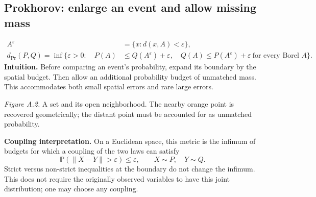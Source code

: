 \documentclass[12pt]{article}
\newcommand{\Prob}{\mathbb P}
\begin{document}
\clearpage
\subsection{Prokhorov: enlarge an event and allow missing mass}\label{sec:prok}
\begin{align}
 A^\varepsilon&=\{x:d(x,A)<\varepsilon\},\\
 d_{\mathrm{Pr}}(P,Q)=\inf\{\varepsilon>0:\quad
 P(A)&\le Q(A^\varepsilon)+\varepsilon,\quad
 Q(A)\le P(A^\varepsilon)+\varepsilon
 \ \text{for every Borel }A\}.
\end{align}
\textbf{Intuition.} Before comparing an event's probability, expand its
boundary by the spatial budget. Then allow an additional probability
budget of unmatched mass. This accommodates both small spatial errors and
rare large errors.

\begin{center}
\end{center}
\textit{Figure A.2.} A set and its open neighborhood. The nearby orange point
is recovered geometrically; the distant point must be accounted for as
unmatched probability.

\textbf{Coupling interpretation.} On a Euclidean space, this metric is the
infimum of budgets for which a coupling of the two laws can satisfy
\begin{equation}
 \Prob(\|X-Y\|>\varepsilon)\le\varepsilon,
 \qquad X\sim P,\quad Y\sim Q.
\end{equation}
Strict versus non-strict inequalities at the boundary do not change the
infimum. This does not require the originally observed variables to have
this joint distribution; one may choose any coupling.
\end{document}
